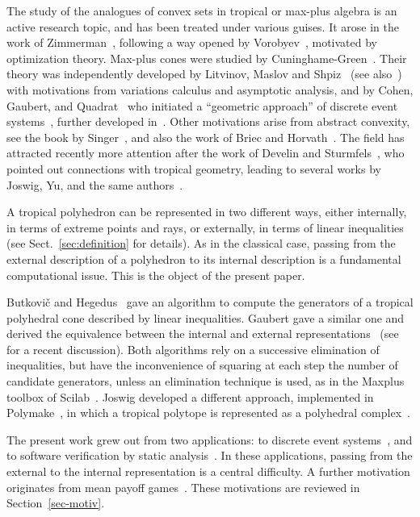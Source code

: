 \documentclass[proceedings]{stacs}
\begin{document}
The study of the analogues of convex sets in tropical or max-plus algebra is an active research topic, and has been treated under various guises. It arose in the work of Zimmerman~\cite{zimmerman77}, following a way opened by Vorobyev~\cite{vorobyev67}, motivated by optimization theory.
Max-plus cones 
were studied by Cuninghame-Green~\cite{CG}. Their theory was independently developed by Litvinov, Maslov and Shpiz~\cite{litvinov00} (see also~\cite{maslov92}) with motivations from variations calculus and asymptotic
analysis, and by Cohen, Gaubert, and Quadrat~\cite{cgq02} who initiated a ``geometric approach'' of discrete event systems~\cite{ccggq99}, further developed in~\cite{katz05,loiseau}. Other motivations
arise from abstract convexity, see the book by Singer~\cite{ACA},
and also the work of Briec and Horvath~\cite{BriecHorvath04}. The field has attracted recently more attention after the work of Develin and Sturmfels~\cite{DS}, who pointed out connections with tropical geometry, leading to several works 
by Joswig, Yu, and the same authors~\cite{joswig04,DevelinYu,JSY07,joswig-2008}.

A tropical polyhedron can be represented in two different ways, either internally, in terms of extreme points and rays, or externally, in terms of linear inequalities (see Sect.~\ref{sec:definition} for details). As in the classical case, passing from the external description of a polyhedron to its internal description is a fundamental computational issue. This is the object of the present paper.

Butkovi\v{c} and Hegedus~\cite{butkovicH} gave an algorithm to compute the generators of a tropical polyhedral cone 
described by linear inequalities. Gaubert gave a similar one and derived the equivalence between the internal and external representations~\cite[Ch.~III]{gaubert92a} (see~\cite{GK09b} for a recent discussion). Both algorithms rely on a successive elimination of inequalities, but have the inconvenience of squaring at each step the number of candidate generators, unless an elimination technique is used, as in the Maxplus toolbox of {\sc Scilab}~\cite{toolbox}. Joswig developed a different approach, implemented in {\sc Polymake}~\cite{polymake}, in which a tropical polytope is represented as a polyhedral complex~\cite{DS,joswig-2008}. 



The present work grew out from two applications: to discrete event systems~\cite{katz05,loiseau}, and to software verification by static analysis~\cite{AGG08}.
In these applications, passing
from the external to the internal representation is a central
difficulty. A further motivation originates from mean payoff games~\cite{AGGut09}. These motivations are reviewed in Section~\ref{sec-motiv}.
\end{document}
